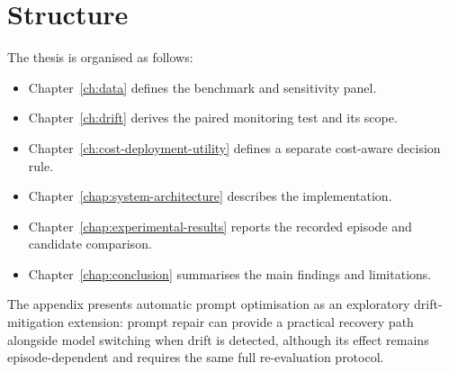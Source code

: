 \section{Structure}
The thesis is organised as follows:
\begin{itemize}
    \item Chapter~\ref{ch:data} defines the benchmark and sensitivity panel.
    \item Chapter~\ref{ch:drift} derives the paired monitoring test and its scope.
    \item Chapter~\ref{ch:cost-deployment-utility} defines a separate cost-aware decision rule.
    \item Chapter~\ref{chap:system-architecture} describes the implementation.
    \item Chapter~\ref{chap:experimental-results} reports the recorded episode and candidate comparison.
    \item Chapter~\ref{chap:conclusion} summarises the main findings and limitations.
\end{itemize}
The appendix presents automatic prompt optimisation as an exploratory drift-mitigation extension: prompt repair can provide a practical recovery path alongside model switching when drift is detected, although its effect remains episode-dependent and requires the same full re-evaluation protocol.
